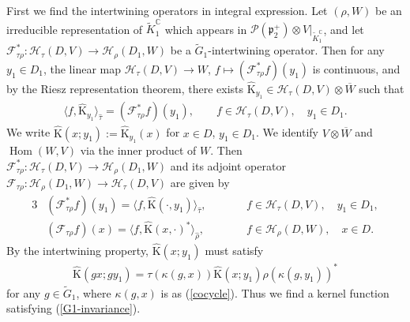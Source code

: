 \documentclass[pdftex]{sigma}
\numberwithin{equation}{section}
\newcommand{\BC}{\mathbb{C}}
\newcommand{\fp}{\mathfrak{p}}
\newcommand{\cF}{\mathcal{F}}
\newcommand{\cH}{\mathcal{H}}
\newcommand{\cP}{\mathcal{P}}
\newcommand{\rK}{\mathrm{K}}
\newcommand{\Hom}{\operatorname{Hom}}
\begin{document}
First we find the intertwining operators in integral expression.
Let $(\rho,W)$ be an irreducible representation of $\tilde{K}_1^\BC$ which appears in $\cP(\fp^+_2)\otimes V|_{\tilde{K}_1^\BC}$,
and let $\cF_{\tau\rho}^*\colon \cH_\tau(D,V)\to \cH_{\rho}(D_1,W)$ be a $\tilde{G}_1$-intertwining operator.
Then for any $y_1\in D_1$, the linear map $\cH_\tau(D,V)\to W$, $f\mapsto (\cF_{\tau\rho}^* f)(y_1)$ is continuous,
and by the Riesz representation theorem, there exists $\hat{\rK}_{y_1}\in\cH_\tau(D,V)\otimes \overline{W}$ such that
\begin{gather*} \langle f,\hat{\rK}_{y_1}\rangle_{\hat{\tau}}=(\cF_{\tau\rho}^* f)(y_1), \qquad f\in\cH_\tau(D,V),\quad y_1\in D_1. \end{gather*}
We write $\hat{\rK}(x;y_1):=\hat{\rK}_{y_1}(x)$ for $x\in D$, $y_1\in D_1$.
We identify $V\otimes \overline{W}$ and $\Hom(W,V)$ via the inner product of $W$.
Then $\cF_{\tau\rho}^*\colon \cH_\tau(D,V)\to \cH_{\rho}(D_1,W)$ and its adjoint operator $\cF_{\tau\rho}\colon \cH_\rho(D_1,W)\to \cH_\tau(D,V)$ are given by
\begin{alignat*}{3}
&(\cF_{\tau\rho}^* f)(y_1)=\langle f,\hat{\rK}(\cdot,y_1)\rangle_{\hat{\tau}},\qquad && f\in\cH_\tau(D,V),\quad y_1\in D_1,\\
& (\cF_{\tau\rho} f)(x)=\langle f,\hat{\rK}(x,\cdot)^*\rangle_{\hat{\rho}}, \qquad && f\in\cH_\rho(D,W),\quad x\in D.
\end{alignat*}
By the intertwining property, $\hat{\rK}(x;y_1)$ must satisfy
\begin{gather}\label{G1-invariance}
\hat{\rK}(gx;gy_1)=\tau(\kappa(g,x))\hat{\rK}(x;y_1)\rho(\kappa(g,y_1))^*
\end{gather}
for any $g\in\tilde{G}_1$, where $\kappa(g,x)$ is as (\ref{cocycle}). Thus we find a kernel function satisfying (\ref{G1-invariance}).
\end{document}
